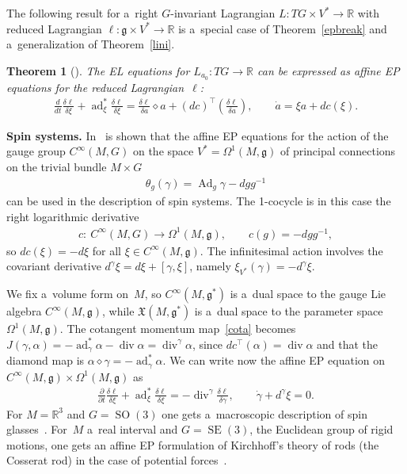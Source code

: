 \documentclass[10pt,a4paper]{amsart}
\numberwithin{equation}{section}
\newtheorem{Theorem}{Theorem}[section]
\begin{document}
The following result for a~right $G$-invariant Lagrangian $L:TG\times V^*\rightarrow\mathbb{R}$ with reduced Lagrangian
$\ell:\mathfrak{g}\times V^*\rightarrow\mathbb{R}$ is a~special case of Theorem~\ref{epbreak} and a~generalization of
Theorem~\ref{lini}.

\begin{Theorem}[\cite{GBR}]
The EL equations for $L_{a_0}:TG\to\mathbb R$ can be expressed as affine EP equations for the reduced
Lagrangian~$\ell$:
\begin{gather}
\label{epaffine}
{\frac{d}{dt}\frac{\delta\ell}{\delta\xi}+\operatorname{ad}^*_\xi\frac{\delta \ell}{\delta\xi}=\frac{\delta\ell}{\delta
a}\diamond a+(dc)^\top\left(\frac{\delta \ell}{\delta a}\right)},
\qquad
\dot{a}=\xi a+dc(\xi).
\end{gather}
\end{Theorem}

{\bf Spin systems.} In~\cite{GBR} is shown that the af\/f\/ine EP equations for the action of the gauge group
$C^{\infty}(M,G)$ on the space $V^*=\Omega^1(M,\mathfrak g)$ of principal connections on the trivial bundle $M\times G$
\begin{gather}
\label{gaug}
\theta_g(\gamma)=\operatorname{Ad}_{g}\gamma-dgg^{-1}
\end{gather}
can be used in the description of spin systems.
The 1-cocycle is in this case the right logarithmic derivative
\begin{gather*}
c: \ C^{\infty}(M,G)\to\Omega^1(M,\mathfrak g),
\qquad
c(g)=-dgg^{-1},
\end{gather*}
so $dc(\xi)=-d\xi$ for all $\xi\in C^{\infty}(M,\mathfrak g)$.
The inf\/initesimal action involves the covariant derivative $d^\gamma\xi=d\xi+[\gamma,\xi]$, namely
$\xi_{V^*}(\gamma)=-d^\gamma\xi$.

We f\/ix a~volume form on~$M$, so $C^{\infty}(M,\mathfrak g^*)$ is a~dual space to the gauge Lie algebra
$C^{\infty}(M,\mathfrak g)$, while $\mathfrak X(M,\mathfrak g^*)$ is a~dual space to the parameter space
$\Omega^1(M,\mathfrak g)$.
The cotangent momentum map~\eqref{cota} becomes $J(\gamma,\alpha)
=-\operatorname{ad}^*_\gamma\alpha-\operatorname{div}\alpha=\operatorname{div}^\gamma\alpha$, since
$dc^\top(\alpha)=\operatorname{div}\alpha$ and that the diamond map is
$\alpha\diamond\gamma=-\operatorname{ad}^*_\gamma\alpha$.
We can write now the af\/f\/ine EP equation on $C^{\infty}(M,\mathfrak g)\times\Omega^1(M,\mathfrak g)$ as
\begin{gather}
\label{spin}
\frac{\partial}{\partial
t}\frac{\delta\ell}{\delta\xi}+\operatorname{ad}^*_\xi\frac{\delta\ell}{\delta\xi}=-\operatorname{div}^\gamma\frac{\delta\ell}{\delta
\gamma},
\qquad
\dot\gamma+d^\gamma\xi=0.
\end{gather}
For $M=\mathbb R^3$ and $G=\operatorname{SO}(3)$ one gets a~macroscopic description of spin glasses~\cite{GBR}.
For~$M$ a~real interval and $G=\operatorname{SE}(3)$, the Euclidean group of rigid motions, one gets an af\/f\/ine EP
formulation of Kirchhof\/f's theory of rods (the Cosserat rod) in the case of potential forces~\cite{GBHR}.
\end{document}
